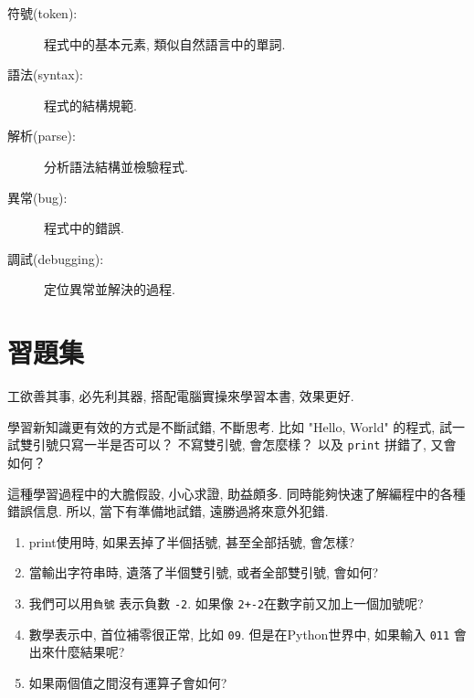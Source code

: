 \documentclass[10pt]{book}
\begin{document}
\begin{description}
\item[符號(token):] 程式中的基本元素, 類似自然語言中的單詞. 

\item[語法(syntax):] 程式的結構規範. 

\item[解析(parse):] 分析語法結構並檢驗程式. 

\item[異常(bug):] 程式中的錯誤. 

\item[調試(debugging):] 定位異常並解決的過程. 

\end{description}


\section{習題集}

\begin{exercise}

工欲善其事, 必先利其器, 搭配電腦實操來學習本書, 效果更好. 

學習新知識更有效的方式是不斷試錯, 不斷思考. 比如 "Hello, World" 的程式, 
試一試雙引號只寫一半是否可以？
不寫雙引號, 會怎麼樣？
以及 {\tt print} 拼錯了, 又會如何？

這種學習過程中的大膽假設, 小心求證, 助益頗多. 
同時能夠快速了解編程中的各種錯誤信息. 
所以, 當下有準備地試錯, 遠勝過將來意外犯錯. 

\begin{enumerate}

\item print使用時, 如果丟掉了半個括號, 甚至全部括號, 會怎樣?

\item 當輸出字符串時, 遺落了半個雙引號, 或者全部雙引號, 會如何? 

\item 我們可以用{\tt 負號} 表示負數 {\tt -2}. 
如果像 {\tt 2+-2}在數字前又加上一個加號呢? 


\item 數學表示中, 首位補零很正常, 比如 {\tt09}. 
但是在Python世界中, 如果輸入 {\tt 011} 會出來什麼結果呢?

\item 如果兩個值之間沒有運算子會如何? 

\end{enumerate}

\end{exercise}
\end{document}
